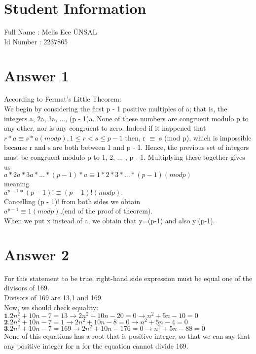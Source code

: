 \documentclass[12pt]{article}
\begin{document}
\section*{Student Information } 
Full Name : Melis Ece ÜNSAL	 \\
Id Number :  2237865\\

\section*{Answer 1}
According to Fermat's Little Theorem:\\
We begin by considering the first p - 1 positive multiples of a; that is, the integers a, 2a, 3a, ..., (p - 1)a. None of these numbers are congruent modulo p to any other, nor is any congruent to zero. Indeed if it happened that \\
$r * a \equiv s * a (mod p),  1 \leq r < s \leq p - 1$
then, r $\equiv$ s (mod p), which is impossible because r and s are both between 1 and p - 1. Hence, the previous set of integers must be congruent modulo p to 1, 2, ... , p - 1. Multiplying these  together gives us\\
$a * 2a * 3a * ... * (p - 1) * a \equiv 1 * 2 * 3 * ... * (p - 1)(mod p)$\\
meaning\\
$a^{p-1} * (p - 1)! \equiv (p - 1)!(mod p).$\\
Cancelling (p - 1)! from both sides we obtain\\
$a^{p-1} \equiv 1 (mod p)$,(end of the proof of theorem).\\
When we put x instead of a, we obtain that y=(p-1) and also y$|$(p-1).

\section*{Answer 2}
For this statement to be true, right-hand side expression must be equal one of the divisors of 169.\\
Divisors of 169 are 13,1 and 169.\\
Now, we should check equality:\\
$\textbf{1.} 2n^{2}+10n-7 = 13 \rightarrow 2n^{2}+10n-20=0 \rightarrow n^{2}+5n-10=0 $\\
$\textbf{2.} 2n^{2}+10n-7 = 1 \rightarrow 2n^{2}+10n-8=0 \rightarrow n^{2}+5n-4=0 $ \\
$\textbf{3.} 2n^{2}+10n-7 = 169 \rightarrow 2n^{2}+10n-176=0 \rightarrow n^{2}+5n-88=0 $ \\
None of this equations has a root that is positive integer, so that we can say that any positive integer for n for the equation cannot divide 169.
\end{document}
